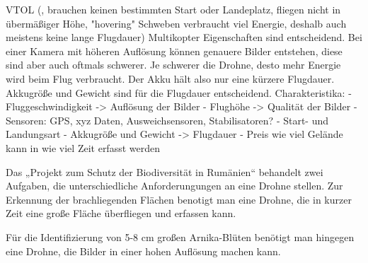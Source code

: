 VTOL (, brauchen keinen bestimmten Start oder Landeplatz, fliegen nicht in übermäßiger Höhe, "hovering" Schweben verbraucht viel Energie, deshalb auch meistens keine lange Flugdauer)
Multikopter
Eigenschaften sind entscheidend. Bei einer Kamera mit höheren Auflösung können genauere Bilder entstehen, diese sind aber auch oftmals schwerer. Je schwerer die Drohne, desto mehr Energie wird beim Flug verbraucht. Der Akku hält also nur eine kürzere Flugdauer. Akkugröße und Gewicht sind für die Flugdauer entscheidend. 
Charakteristika:
- Fluggeschwindigkeit -> Auflösung der Bilder
- Flughöhe -> Qualität der Bilder
- Sensoren: GPS, xyz Daten, Ausweichsensoren, Stabilisatoren?
- Start- und Landungsart
- Akkugröße und Gewicht -> Flugdauer 
- Preis
wie viel Gelände kann in wie viel Zeit erfasst werden

Das „Projekt zum Schutz der Biodiversität in Rumänien“ behandelt zwei Aufgaben, die unterschiedliche Anforderungungen an eine Drohne stellen. Zur Erkennung der brachliegenden Flächen benotigt man eine Drohne, die in kurzer Zeit eine große Fläche überfliegen und erfassen kann. 

Für die Identifizierung von 5-8 cm großen Arnika-Blüten benötigt man hingegen eine Drohne, die Bilder in einer hohen Auflösung machen kann.

